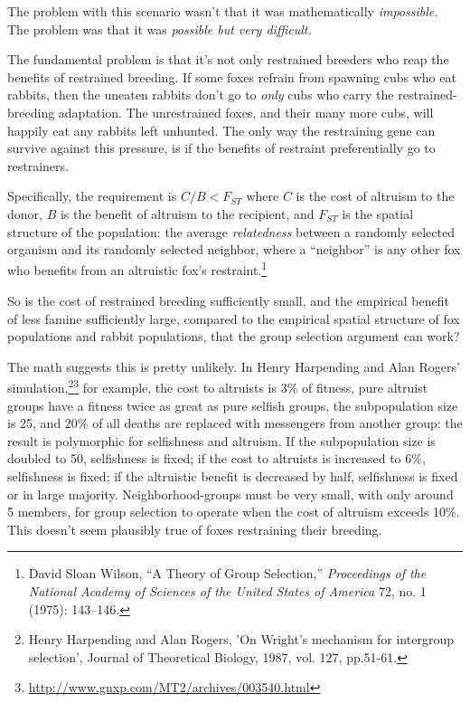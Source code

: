  The problem with this scenario wasn't that it was
mathematically \textit{impossible.} The problem was that it was
\textit{possible but very difficult.}


 The fundamental problem is that it's not only
restrained breeders who reap the benefits of restrained breeding. If
some foxes refrain from spawning cubs who eat rabbits, then the uneaten
rabbits don't go to \textit{only} cubs who carry the
restrained-breeding adaptation. The unrestrained foxes, and their many
more cubs, will happily eat any rabbits left unhunted. The only way the
restraining gene can survive against this pressure, is if the benefits
of restraint preferentially go to restrainers.

{
 Specifically, the requirement is $C/B <
F_{ST}$ where $C$ is the cost of altruism to the donor, $B$ is
the benefit of altruism to the recipient, and $F_{ST}$ is
the spatial structure of the population: the average
\textit{relatedness} between a randomly selected organism and its
randomly selected neighbor, where a
``neighbor'' is any other fox who
benefits from an altruistic fox's
restraint.\footnote{David Sloan Wilson, ``A Theory of Group
Selection,'' \textit{Proceedings of the National
Academy of Sciences of the United States of America} 72, no. 1 (1975):
143--146.}}


 So is the cost of restrained breeding sufficiently small, and the
empirical benefit of less famine sufficiently large, compared to the
empirical spatial structure of fox populations and rabbit populations,
that the group selection argument can work?


 The math suggests this is pretty unlikely. In Henry Harpending and Alan Rogers' simulation,\footnote{Henry Harpending and Alan Rogers, 'On Wright's mechanism for intergroup selection’, Journal of Theoretical Biology, 1987, vol. 127, pp.51-61.}\supercomma\footnote{\url{http://www.gnxp.com/MT2/archives/003540.html}} for
example, the cost to altruists is 3\% of fitness, pure altruist groups
have a fitness twice as great as pure selfish groups, the subpopulation
size is 25, and 20\% of all deaths are replaced with messengers from
another group: the result is polymorphic for selfishness and altruism.
If the subpopulation size is doubled to 50, selfishness is fixed; if
the cost to altruists is increased to 6\%, selfishness is fixed; if the
altruistic benefit is decreased by half, selfishness is fixed or in
large majority. Neighborhood-groups must be very small, with only
around 5 members, for group selection to operate when the cost of
altruism exceeds 10\%. This doesn't seem plausibly true
of foxes restraining their breeding.


